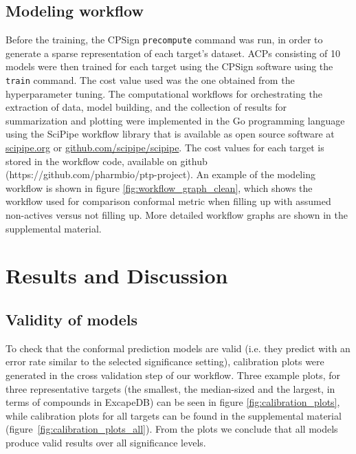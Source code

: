 \documentclass[utf8]{frontiersSCNS} %
\begin{document}
\subsection{Modeling workflow}
Before the training, the CPSign \texttt{precompute} command was run, in order to
generate a sparse representation of each target's dataset.
ACPs consisting of 10 models were then trained for each target using the CPSign software using the \texttt{train} command.
The cost value used was the one obtained from the hyperparameter tuning.
The computational workflows for orchestrating the extraction of data, model building,
and the collection of results for summarization and plotting were
implemented in the Go programming language using the SciPipe workflow library
that is available as open source software at
\href{http://scipipe.org}{scipipe.org} or \href{https://github.com/scipipe/scipipe}{github.com/scipipe/scipipe}.
The cost values for each target is stored in the workflow code, available on
github (https://github.com/pharmbio/ptp-project).  An example of the modeling
workflow is shown in figure \ref{fig:workflow_graph_clean}, which shows the workflow
used for comparison conformal metric when filling up with assumed non-actives versus
not filling up. More detailed workflow graphs are shown in the supplemental material.





\section*{Results and Discussion}

\subsection{Validity of models}
To check that the conformal prediction models are valid (i.e. they predict with
an error rate similar to the selected significance setting), calibration plots
were generated in the cross validation step of our workflow. Three example
plots, for three representative targets (the smallest, the median-sized and the
largest, in terms of compounds in ExcapeDB) can be seen in figure
\ref{fig:calibration_plots}, while calibration plots for all targets can be
found in the supplemental material (figure~\ref{fig:calibration_plots_all}).
From the plots we conclude that all models produce valid results over all
significance levels.
\end{document}
